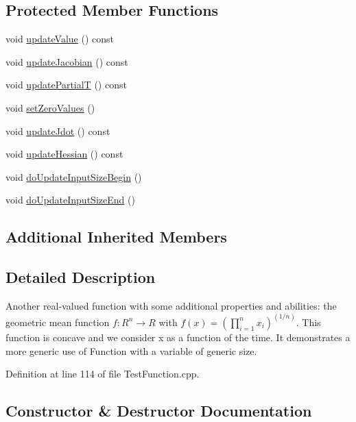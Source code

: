 \subsection*{Protected Member Functions}
\begin{DoxyCompactItemize}
\item 
void \hyperlink{classFunction2_a2b3445b8df34f192718767d23f14e559}{update\+Value} () const 
\item 
void \hyperlink{classFunction2_a17553f2836b45ae9e081640063771b59}{update\+Jacobian} () const 
\item 
void \hyperlink{classFunction2_ab2109819dbc9ea730d585b92fcb75aa8}{update\+PartialT} () const 
\item 
void \hyperlink{classFunction2_ad1ba3ed750cfec23435dcd9f37c10eec}{set\+Zero\+Values} ()
\item 
void \hyperlink{classFunction2_a09cd264d1941f9cbafc9bfa8ac65be32}{update\+Jdot} () const 
\item 
void \hyperlink{classFunction2_a32d4dc0f248fed14fa9a12d9ea9fdbdf}{update\+Hessian} () const 
\item 
void \hyperlink{classFunction2_ab05887e9f8995782cdc3f9399c476c4e}{do\+Update\+Input\+Size\+Begin} ()
\item 
void \hyperlink{classFunction2_a6a875214e7fa8b07f064cd699ac29ff6}{do\+Update\+Input\+Size\+End} ()
\end{DoxyCompactItemize}
\subsection*{Additional Inherited Members}


\subsection{Detailed Description}
Another real-\/valued function with some additional properties and abilities\+: the geometric mean function $ f: R^n \rightarrow R $ with $ f(x) = \left(\prod_{i=1}^n x_i\right)^(1/n) $. This function is concave and we consider x as a function of the time. It demonstrates a more generic use of Function with a variable of generic size. 

Definition at line 114 of file Test\+Function.\+cpp.



\subsection{Constructor \& Destructor Documentation}
